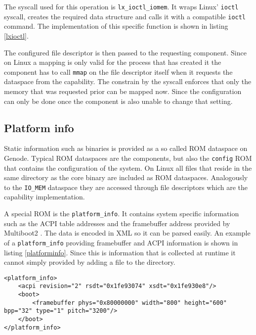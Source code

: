 \documentclass[
a4paper,
12pt,
notitlepage,
parskip=half,
DIV=11,
]{scrbook}
\begin{document}
		The syscall used for this operation is \texttt{lx\_ioctl\_iomem}.
		It wraps Linux' \texttt{ioctl} syscall, creates the required data structure and calls it with a compatible \texttt{ioctl} command.
		The implementation of this specific function is shown in listing \ref{lxioctl}.
		
		The configured file descriptor is then passed to the requesting component.
		Since on Linux a mapping is only valid for the process that has created it the component has to call \texttt{mmap} on the file descriptor itself when it requests the dataspace from the capability.
		The constrain by the syscall enforces that only the memory that was requested prior can be mapped now.
		Since the configuration can only be done once the component is also unable to change that setting.
		
		\subsection{Platform info}
		\label{pinfo}
		
		Static information such as binaries is provided as a so called ROM dataspace on Genode.
		Typical ROM dataspaces are the components, but also the \texttt{config} ROM that contains the configuration of the system.
		On Linux all files that reside in the same directory as the core binary are included as ROM dataspaces.
		Analogously to the \texttt{IO\_MEM} dataspace they are accessed through file descriptors which are the capability implementation.
		
		A special ROM is the \texttt{platform\_info}.
		It contains system specific information such as the ACPI \citep{acpi_spec} table addresses and the framebuffer address provided by Multiboot2 \citep{multiboot2}.
		The data is encoded in XML so it can be parsed easily.
		An example of a \texttt{platform\_info} providing framebuffer and ACPI information is shown in listing \ref{platforminfo}.
		Since this is information that is collected at runtime it cannot simply provided by adding a file to the directory.
		
		\begin{lstlisting}[basicstyle=\ttfamily\footnotesize]
<platform_info>
	<acpi revision="2" rsdt="0x1fe93074" xsdt="0x1fe930e8"/>
	<boot>
		<framebuffer phys="0x80000000" width="800" height="600" bpp="32" type="1" pitch="3200"/>
	</boot>
</platform_info>
		\end{lstlisting}
		
\end{document}
